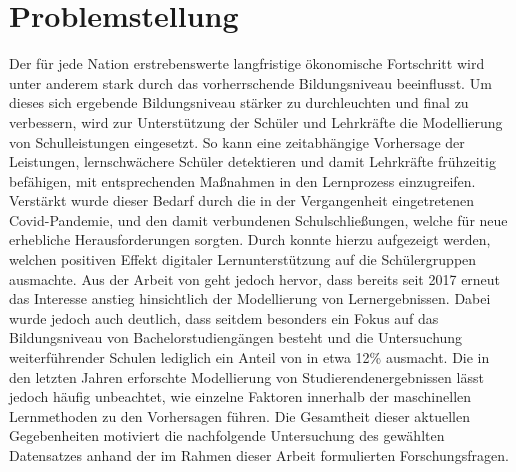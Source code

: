 \chapter[Problemstellung]{Problemstellung}

Der für jede Nation erstrebenswerte langfristige ökonomische Fortschritt wird unter anderem stark durch das vorherrschende Bildungsniveau beeinflusst. \cite[S. 1]{Cortez2008UsingDM} 
Um dieses sich ergebende Bildungsniveau stärker zu durchleuchten und final zu verbessern, wird zur Unterstützung der Schüler und Lehrkräfte die Modellierung von Schulleistungen eingesetzt. \cite[S. 1]{Cortez2008UsingDM} 
So kann eine zeitabhängige Vorhersage der Leistungen, lernschwächere Schüler detektieren und damit Lehrkräfte frühzeitig befähigen, mit entsprechenden Maßnahmen in den Lernprozess einzugreifen. \cite[S. 2]{Namoun.2021} 
Verstärkt wurde dieser Bedarf durch die in der Vergangenheit eingetretenen Covid-Pandemie, und den damit verbundenen Schulschließungen, welche für neue erhebliche Herausforderungen sorgten. \cite[S. 2]{Clark.2021} 
Durch \cite[S. 13]{Clark.2021} konnte hierzu aufgezeigt werden, welchen positiven Effekt digitaler Lernunterstützung auf die Schülergruppen ausmachte.
Aus der Arbeit von \cite[S. 9]{Namoun.2021} geht jedoch hervor, dass bereits seit 2017 erneut das Interesse anstieg hinsichtlich der Modellierung von Lernergebnissen. 
Dabei wurde jedoch auch deutlich, dass seitdem besonders ein Fokus auf das Bildungsniveau von Bachelorstudiengängen besteht und die Untersuchung weiterführender Schulen lediglich ein Anteil von in etwa 12\% ausmacht. \cite[S. 11]{Namoun.2021} 
Die in den letzten Jahren erforschte Modellierung von Studierendenergebnissen lässt jedoch häufig unbeachtet, wie einzelne Faktoren innerhalb der maschinellen Lernmethoden zu den Vorhersagen führen. \cite[S. 19]{Namoun.2021}
Die Gesamtheit dieser aktuellen Gegebenheiten motiviert die nachfolgende Untersuchung des gewählten Datensatzes anhand der im Rahmen dieser Arbeit formulierten Forschungsfragen.